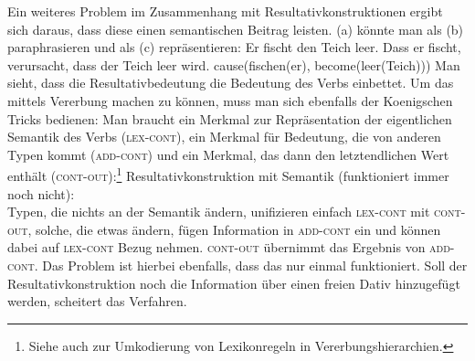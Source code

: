 Ein weiteres Problem im Zusammenhang mit Resultativkonstruktionen ergibt sich daraus, dass
diese einen semantischen Beitrag leisten. (a) könnte man als (b) paraphrasieren
und als (c) repräsentieren:
\eal
\ex Er fischt den Teich leer.
\ex Dass er fischt, verursacht, dass der Teich leer wird.
\ex cause(fischen(er), become(leer(Teich)))
\zl
Man sieht, dass die Resultativbedeutung die Bedeutung des Verbs einbettet. Um das mittels Vererbung
machen zu können, muss man sich ebenfalls der Koenigschen Tricks bedienen: Man braucht ein Merkmal
zur Repräsentation der eigentlichen Semantik des Verbs (\textsc{lex-cont}), ein Merkmal für
Bedeutung, die von anderen Typen kommt (\textsc{add-cont}) und ein Merkmal, das dann den letztendlichen
Wert enthält (\textsc{cont-out}):\footnote{
  Siehe auch  zur Umkodierung von Lexikonregeln in Vererbungshierarchien.
}
\ea
Resultativkonstruktion mit Semantik (funktioniert immer noch nicht):\\
\z
Typen, die nichts an der Semantik ändern, unifizieren einfach \textsc{lex-cont} mit \textsc{cont-out},
solche, die etwas ändern, fügen Information in \textsc{add-cont} ein und können dabei auf \textsc{lex-cont}
Bezug nehmen. \textsc{cont-out} übernimmt das Ergebnis von \textsc{add-cont}. Das Problem ist hierbei ebenfalls,
dass das nur einmal funktioniert. Soll der Resultativkonstruktion noch die Information über einen
freien Dativ hinzugefügt werden, scheitert das Verfahren.


